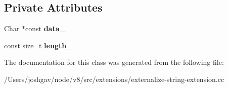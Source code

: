 \subsection*{Private Attributes}
\begin{DoxyCompactItemize}
\item 
Char $\ast$const {\bfseries data\+\_\+}\hypertarget{classv8_1_1internal_1_1_simple_string_resource_a2f4727903373ca7bab5015196a41f99a}{}\label{classv8_1_1internal_1_1_simple_string_resource_a2f4727903373ca7bab5015196a41f99a}

\item 
const size\+\_\+t {\bfseries length\+\_\+}\hypertarget{classv8_1_1internal_1_1_simple_string_resource_a760b938cf1196f2bc6050c19d1f18a57}{}\label{classv8_1_1internal_1_1_simple_string_resource_a760b938cf1196f2bc6050c19d1f18a57}

\end{DoxyCompactItemize}


The documentation for this class was generated from the following file\+:\begin{DoxyCompactItemize}
\item 
/\+Users/joshgav/node/v8/src/extensions/externalize-\/string-\/extension.\+cc\end{DoxyCompactItemize}
